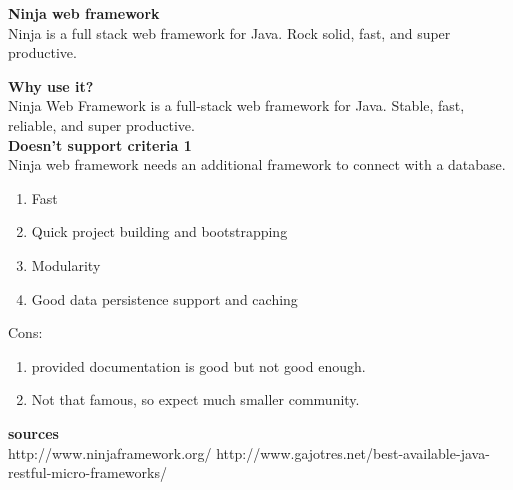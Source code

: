 \textbf{Ninja web framework} \\
Ninja is a full stack web framework for Java.
Rock solid, fast, and super productive.

\textbf{Why use it?} \\
Ninja Web Framework is a full-stack web framework for Java. Stable, fast, reliable, and super productive. \\

\textbf{Doesn't support criteria 1}\\
Ninja web framework needs an additional framework  to connect with a database.

\begin{enumerate}
	\item Fast
	\item Quick project building and bootstrapping
	\item Modularity
	\item Good data persistence support and caching
\end{enumerate}
Cons:
\begin{enumerate}
	\item provided documentation is good but not good enough.
	\item Not that famous, so expect much smaller community.
\end{enumerate}

\textbf{sources}\\
http://www.ninjaframework.org/
http://www.gajotres.net/best-available-java-restful-micro-frameworks/
